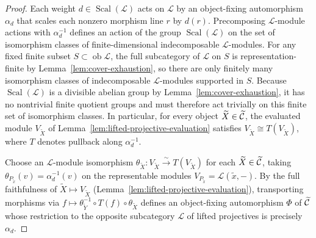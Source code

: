 \begin{proof}
Each weight $d\in\operatorname{Scal}(\mathcal L)$ acts on $\mathcal L$ by an
object-fixing automorphism $\alpha_d$ that scales each nonzero morphism line
$r$ by $d(r)$. Precomposing $\mathcal L$-module actions with $\alpha_d^{-1}$
defines an action of the group $\operatorname{Scal}(\mathcal L)$ on the set
of isomorphism classes of finite-dimensional indecomposable
$\mathcal L$-modules. For any fixed finite subset
$S\subset\operatorname{ob}\mathcal L$, the full subcategory of $\mathcal L$
on $S$ is representation-finite by Lemma~\ref{lem:cover-exhaustion}, so there
are only finitely many isomorphism classes of indecomposable
$\mathcal L$-modules supported in $S$. Because $\operatorname{Scal}(\mathcal L)$
is a divisible abelian group by Lemma~\ref{lem:cover-exhaustion}, it has no
nontrivial finite quotient groups and must therefore act trivially on this
finite set of isomorphism classes. In particular, for every object
$\widetilde X\in\widetilde{\mathcal C}$, the evaluated module $V_{\widetilde X}$ of
Lemma~\ref{lem:lifted-projective-evaluation} satisfies
$V_{\widetilde X}\cong T(V_{\widetilde X})$, where $T$ denotes pullback along
$\alpha_d^{-1}$.

Choose an $\mathcal L$-module isomorphism
$\theta_{\widetilde X}:V_{\widetilde X}\xrightarrow{\sim}T(V_{\widetilde X})$
for each $\widetilde X\in\widetilde{\mathcal C}$, taking
$\theta_{P_{\widetilde x}}(v)=\alpha_d^{-1}(v)$ on the representable modules
$V_{P_{\widetilde x}}=\mathcal L(\widetilde x,-)$. By the full faithfulness
of $\widetilde X\mapsto V_{\widetilde X}$
(Lemma~\ref{lem:lifted-projective-evaluation}), transporting morphisms via
$f\mapsto\theta_{\widetilde Y}^{-1}\circ T(f)\circ\theta_{\widetilde X}$
defines an object-fixing automorphism $\Phi$ of $\widetilde{\mathcal C}$ whose
restriction to the opposite subcategory $\mathcal L$ of lifted projectives is
precisely $\alpha_d$.


\end{proof}
